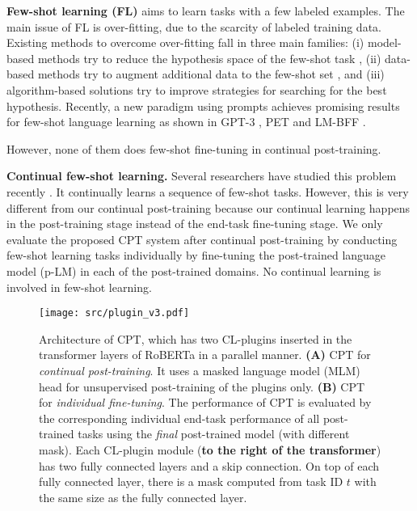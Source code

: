 \documentclass[11pt]{article}
\begin{document}
\textbf{Few-shot learning (FL)} aims to learn tasks with a few labeled examples. The main issue of FL is over-fitting, due to the scarcity of
labeled training data. Existing methods to overcome over-fitting fall in three main families: (i) model-based methods try to reduce the hypothesis space of the few-shot task \cite{DBLP:conf/nips/TriantafillouZU17,DBLP:conf/coling/HuLT0S18}, (ii) data-based methods try to augment additional data to the few-shot set \cite{DBLP:conf/nips/BenaimW18,DBLP:conf/aaai/GaoHX0LLS20}, and (iii) algorithm-based solutions try to improve strategies for searching for the best hypothesis. Recently, a new
paradigm using prompts achieves promising results for few-shot language learning as shown
in GPT-3 \cite{brown2020language}, PET \cite{DBLP:conf/eacl/SchickS21} and LM-BFF \cite{DBLP:conf/acl/GaoFC20}. {\color{black}However, none of them does few-shot fine-tuning in continual post-training. 

\textbf{Continual few-shot learning.} Several researchers have studied this problem recently \cite{DBLP:journals/corr/abs-2004-11967,DBLP:journals/corr/abs-2110-07298,DBLP:conf/emnlp/JinLR021,DBLP:conf/naacl/XiaYFY21,DBLP:conf/acl/0001LX22}. It continually learns a sequence of few-shot tasks. However, this is very different from our continual post-training because our continual learning happens in the post-training stage instead of the end-task fine-tuning stage. We only evaluate the proposed CPT system after continual post-training by conducting few-shot learning tasks individually by fine-tuning the post-trained language model (p-LM) in each of the post-trained domains. No continual learning is involved in few-shot learning.}



\begin{figure*}[h]
\centering
\texttt{[image: src/plugin\_v3.pdf]}
\caption{
Architecture of CPT, which has two CL-plugins inserted in the transformer layers of RoBERTa in a parallel manner. \textbf{(A)} CPT for \textit{continual post-training}. It uses a masked language model (MLM) head for unsupervised post-training of the plugins only. \textbf{(B)} CPT for \textit{individual fine-tuning}. The performance of CPT is evaluated by the corresponding individual end-task performance of all post-trained tasks using the \textit{final} post-trained model (with different mask). Each CL-plugin module (\textbf{to the right of the transformer}) has two fully connected layers and a skip connection. On top of each fully connected layer, there is a mask computed from task ID $t$ with the same size as the fully connected layer.}
\label{plugin}
\end{figure*}
\end{document}
